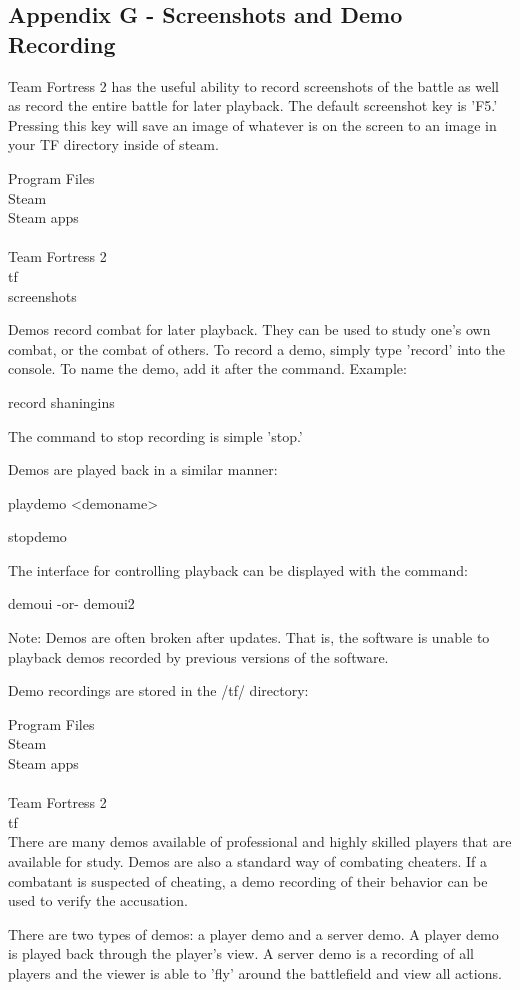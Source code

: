 \subsection{Appendix G - Screenshots and Demo Recording}

Team Fortress 2 has the useful ability to record screenshots of the battle as well as record the entire battle for later playback.  The default screenshot key is 'F5.'  Pressing this key will save an image of whatever is on the screen to an image in your TF directory inside of steam.

Program Files\\Steam\\Steam apps\\<user name>\\Team Fortress 2\\tf\\screenshots

Demos record combat for later playback.  They can be used to study one's own combat, or the combat of others.  To record a demo, simply type 'record' into the console.  To name the demo, add it after the command.  Example:

record shaningins

The command to stop recording is simple 'stop.'

Demos are played back in a similar manner:

playdemo <demoname>

stopdemo

The interface for controlling playback can be displayed with the command:

demoui -or- demoui2

Note:  Demos are often broken after updates.  That is, the software is unable to playback demos recorded by previous versions of the software.

Demo recordings are stored in the /tf/ directory:

Program Files\\Steam\\Steam apps\\<user name>\\Team Fortress 2\\tf\\

There are many demos available of professional and highly skilled players that are available for study.  Demos are also a standard way of combating cheaters.  If a combatant is suspected of cheating, a demo recording of their behavior can be used to verify the accusation.

There are two types of demos: a player demo and a server demo.  A player demo is played back through the player's view.  A server demo is a recording of all players and the viewer is able to 'fly' around the battlefield and view all actions.